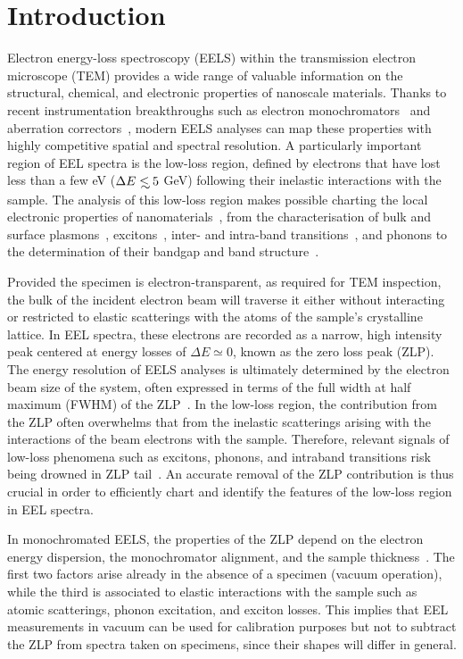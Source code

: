 \section{Introduction}
\label{sec:introduction}

Electron energy-loss spectroscopy (EELS) within the transmission electron microscope (TEM) provides
a wide range of
valuable information on the structural, chemical, and electronic properties of nanoscale materials.
%
Thanks to recent instrumentation breakthroughs
such as electron monochromators~\cite{Terauchi:2005, Freitag:2005} and aberration correctors~\cite{Haider:1998},
modern EELS analyses can map these properties with highly competitive spatial and spectral resolution.
%
A particularly important region of EEL spectra is
the low-loss region, defined by electrons that have lost
less than a few eV ($\Delta E\lsim 5$ GeV) following their inelastic interactions
with the sample.
%
The analysis of this low-loss region makes possible charting the local
electronic properties of nanomaterials~\cite{Geiger:1967}, from the characterisation of
bulk and surface plasmons~\cite{Schaffer:2008}, excitons~\cite{Erni:2005}, 
inter- and intra-band transitions~\cite{Rafferty:1998},
and phonons to the determination of their bandgap and band structure~\cite{Stoger:2008}.


Provided the specimen is electron-transparent, as required for TEM inspection,
the bulk of the incident electron beam will traverse it
either without interacting or restricted to elastic scatterings with the atoms
of the sample's crystalline lattice.
%
In EEL spectra, these electrons are recorded as a narrow,
high intensity peak centered at energy losses
of $\Delta E\simeq 0$, known as the zero loss peak (ZLP).
%
The energy resolution of EELS analyses is ultimately determined by
the electron beam size of the system, often expressed in terms
of the full width at half maximum (FWHM) of the
ZLP~\cite{Egerton:2009}.
%
In the low-loss region, the contribution from the ZLP
often overwhelms that from the inelastic scatterings arising with
the interactions of the beam electrons
with the sample.
%
Therefore, relevant signals of low-loss phenomena such as excitons,
phonons, and intraband transitions risk being drowned
in ZLP tail~\cite{Abajo:2010}.
%
An accurate removal of the ZLP
contribution is thus crucial in order to efficiently chart and identify the features
of the low-loss region in EEL spectra. 

In monochromated EELS, the properties of the ZLP depend on the electron energy dispersion,
the monochromator alignment, and the sample thickness~\cite{Park:2008, Stoger:2008}.
%
The first two factors arise already in the absence of a specimen (vacuum operation),
while the third is associated
to elastic interactions with the sample such as atomic scatterings,
phonon excitation, and exciton losses.
%
This implies that EEL measurements in vacuum can be used for calibration purposes
but not to subtract the ZLP from spectra taken on specimens, since their shapes will differ
in general.



